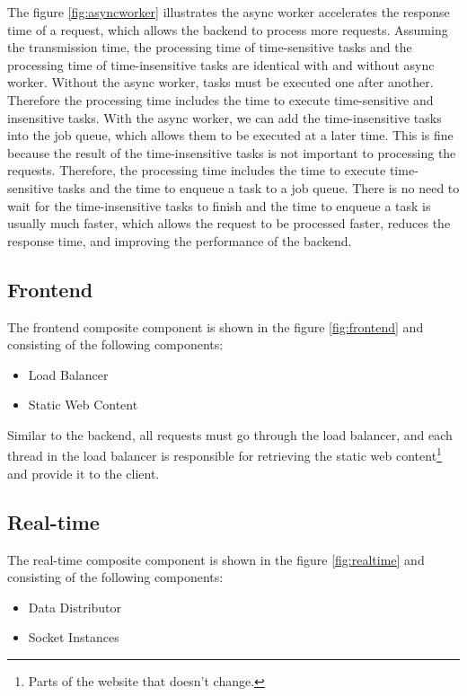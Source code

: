 \documentclass[../thesis.tex]{subfiles}
\begin{document}
The figure \ref{fig:asyncworker} illustrates the async worker accelerates the response time of a request, which allows the backend to process more requests. Assuming the transmission time, the processing time of time-sensitive tasks and the processing time of time-insensitive tasks are identical with and without async worker. Without the async worker, tasks must be executed one after another. Therefore the processing time includes the time to execute time-sensitive and insensitive tasks. With the async worker, we can add the time-insensitive tasks into the job queue, which allows them to be executed at a later time. This is fine because the result of the time-insensitive tasks is not important to processing the requests. Therefore, the processing time includes the time to execute time-sensitive tasks and the time to enqueue a task to a job queue. There is no need to wait for the time-insensitive tasks to finish and the time to enqueue a task is usually much faster, which allows the request to be processed faster, reduces the response time, and improving the performance of the backend.

\subsection{Frontend}
\label{sec:frontend}

The frontend composite component is shown in the figure \ref{fig:frontend} and consisting of the following components:
\begin{itemize}
\item Load Balancer
\item Static Web Content
\end{itemize}

Similar to the backend, all requests must go through the load balancer, and each thread in the load balancer is responsible for retrieving the static web content\footnote{Parts of the website that doesn't change.} and provide it to the client.


\subsection{Real-time}
\label{sec:realtime}

The real-time composite component is shown in the figure \ref{fig:realtime} and consisting of the following components:

\begin{itemize}
\item Data Distributor
\item Socket Instances
\end{itemize}
\end{document}
